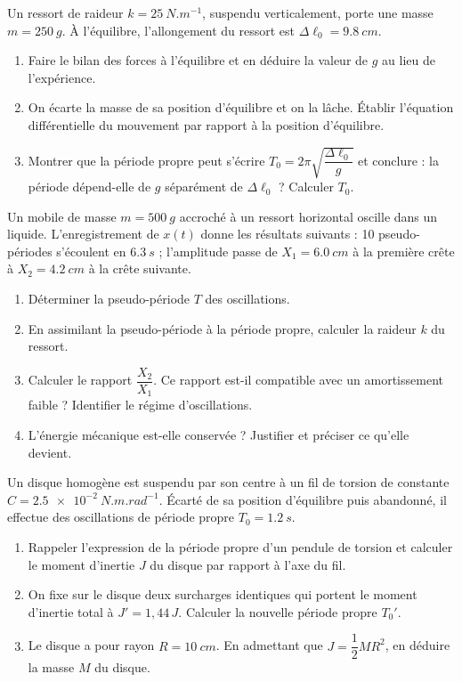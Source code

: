 \documentclass[11pt]{article}
\newcounter{popsec}
\newcounter{popsub}
\newcommand{\courssub}[1]{%
  \stepcounter{popsub}%
  \par\vspace{9pt}\noindent{\popxbold\fontsize{11.5}{13}\selectfont\color{popink}{\color{poporange}\thepopsec.\thepopsub}\hspace{6pt}#1}\par\nopagebreak\vspace{4pt}
}
\begin{document}
\courssub{Je m'entraîne}

\begin{exercice}
Un ressort de raideur $k = \SI{25}{N.m^{-1}}$, suspendu verticalement, porte une masse $m = \SI{250}{g}$. À l'équilibre, l'allongement du ressort est $\Delta\ell_0 = \SI{9,8}{cm}$.
\begin{enumerate}
\item Faire le bilan des forces à l'équilibre et en déduire la valeur de $g$ au lieu de l'expérience.
\item On écarte la masse de sa position d'équilibre et on la lâche. Établir l'équation différentielle du mouvement par rapport à la position d'équilibre.
\item Montrer que la période propre peut s'écrire $T_0 = 2\pi\sqrt{\dfrac{\Delta\ell_0}{g}}$ et conclure : la période dépend-elle de $g$ séparément de $\Delta\ell_0$ ? Calculer $T_0$.
\end{enumerate}
\end{exercice}

\begin{exercice}
Un mobile de masse $m = \SI{500}{g}$ accroché à un ressort horizontal oscille dans un liquide. L'enregistrement de $x(t)$ donne les résultats suivants : 10 pseudo-périodes s'écoulent en $\SI{6,3}{s}$ ; l'amplitude passe de $X_1 = \SI{6,0}{cm}$ à la première crête à $X_2 = \SI{4,2}{cm}$ à la crête suivante.
\begin{enumerate}
\item Déterminer la pseudo-période $T$ des oscillations.
\item En assimilant la pseudo-période à la période propre, calculer la raideur $k$ du ressort.
\item Calculer le rapport $\dfrac{X_2}{X_1}$. Ce rapport est-il compatible avec un amortissement faible ? Identifier le régime d'oscillations.
\item L'énergie mécanique est-elle conservée ? Justifier et préciser ce qu'elle devient.
\end{enumerate}
\end{exercice}

\begin{exercice}
Un disque homogène est suspendu par son centre à un fil de torsion de constante $C = \SI{2,5e-2}{N.m.rad^{-1}}$. Écarté de sa position d'équilibre puis abandonné, il effectue des oscillations de période propre $T_0 = \SI{1,2}{s}$.
\begin{enumerate}
\item Rappeler l'expression de la période propre d'un pendule de torsion et calculer le moment d'inertie $J$ du disque par rapport à l'axe du fil.
\item On fixe sur le disque deux surcharges identiques qui portent le moment d'inertie total à $J' = 1,44\,J$. Calculer la nouvelle période propre $T_0'$.
\item Le disque a pour rayon $R = \SI{10}{cm}$. En admettant que $J = \dfrac{1}{2}MR^2$, en déduire la masse $M$ du disque.
\end{enumerate}
\end{exercice}
\end{document}
